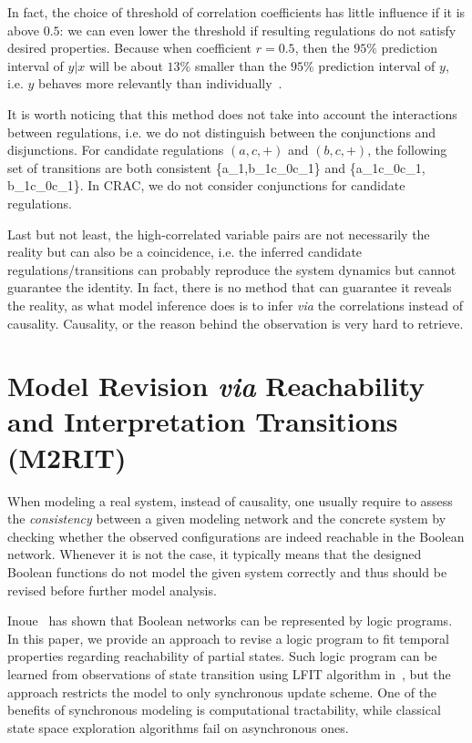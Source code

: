 In fact, the choice of threshold of correlation coefficients has little influence if it is above $0.5$: we can even lower the threshold if resulting regulations do not satisfy desired properties.
Because when coefficient $r =0.5$, then the $95\%$ prediction interval of $y|x$ will be about $13\%$ smaller than the $95\%$ prediction interval of $y$, i.e. $y$ behaves more relevantly than individually~\cite{hull1927correlation}.

It is worth noticing that this method does not take into account the interactions between regulations, i.e. we do not distinguish between the conjunctions and disjunctions.
For candidate regulations $(a,c,+)$ and $(b,c,+)$, the following set of transitions are both consistent \{\ac{a_1,b_1}{c_0}{c_1}\} and \{\ac{a_1}{c_0}{c_1}, \ac{b_1}{c_0}{c_1}\}.
In CRAC, we do not consider conjunctions for candidate regulations.

Last but not least, the high-correlated variable pairs are not necessarily the reality but can also be a coincidence, i.e. the inferred candidate regulations/transitions can probably reproduce the system dynamics but cannot guarantee the identity.
In fact, there is no method that can guarantee it reveals the reality, as what model inference does is to infer \textit{via} the correlations instead of causality.
Causality, or the reason behind the observation is very hard to retrieve.

\section{Model Revision \textit{via} Reachability and Interpretation Transitions (M2RIT)}
When modeling a real system, instead of causality, one usually require to assess the \textit{consistency} between a given modeling network and the concrete system by checking whether the observed configurations are indeed reachable in the Boolean network.
Whenever it is not the case, it typically means that the designed Boolean functions do not model the given system correctly and thus should be revised before further model analysis.

Inoue~\cite{inoue2011logic} has shown that Boolean networks can be represented by logic programs.
In this paper, we provide an approach to revise a logic program to fit temporal properties regarding reachability of partial states.
%
Such logic program can be learned from observations of state transition using LFIT algorithm in~\cite{ribeiro2015learning}, but the approach restricts the model to only synchronous update scheme.
One of the benefits of synchronous modeling is computational tractability, while classical state space exploration algorithms fail on asynchronous ones.

